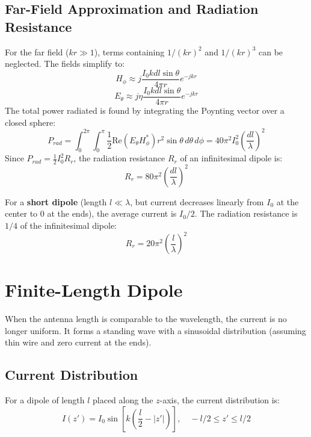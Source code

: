\documentclass[12pt,a4paper]{article}
\begin{document}
\subsection{Far-Field Approximation and Radiation Resistance}
For the far field ($kr \gg 1$), terms containing $1/(kr)^2$ and $1/(kr)^3$ can be neglected. The fields simplify to:
\[
H_\phi \approx j \frac{I_0 k dl \sin\theta}{4\pi r} e^{-jkr}
\]
\[
E_\theta \approx j \eta \frac{I_0 k dl \sin\theta}{4\pi r} e^{-jkr}
\]
The total power radiated is found by integrating the Poynting vector over a closed sphere:
\[
P_{rad} = \int_{0}^{2\pi}\int_{0}^{\pi} \frac{1}{2} \text{Re}(E_\theta H_\phi^*) r^2 \sin\theta \, d\theta \, d\phi = 40 \pi^2 I_0^2 \left(\frac{dl}{\lambda}\right)^{\!2}
\]
Since $P_{rad} = \frac{1}{2} I_0^2 R_r$, the radiation resistance $R_r$ of an infinitesimal dipole is:
\[
R_r = 80 \pi^2 \left(\frac{dl}{\lambda}\right)^{\!2}
\]

\begin{tcolorbox}[defbox, title={\textbf{Note: The Short Dipole}}]
For a \textbf{short dipole} (length $l \ll \lambda$, but current decreases linearly from $I_0$ at the center to $0$ at the ends), the average current is $I_0/2$. The radiation resistance is $1/4$ of the infinitesimal dipole:
\[
R_r = 20\pi^2 \left(\frac{l}{\lambda}\right)^{\!2}
\]
\end{tcolorbox}

\section{Finite-Length Dipole}

When the antenna length is comparable to the wavelength, the current is no longer uniform. It forms a standing wave with a sinusoidal distribution (assuming thin wire and zero current at the ends).

\subsection{Current Distribution}
For a dipole of length $l$ placed along the $z$-axis, the current distribution is:
\[
I(z') = I_0 \sin\left[ k \left( \frac{l}{2} - |z'| \right) \right], \quad -l/2 \le z' \le l/2
\]
\end{document}
